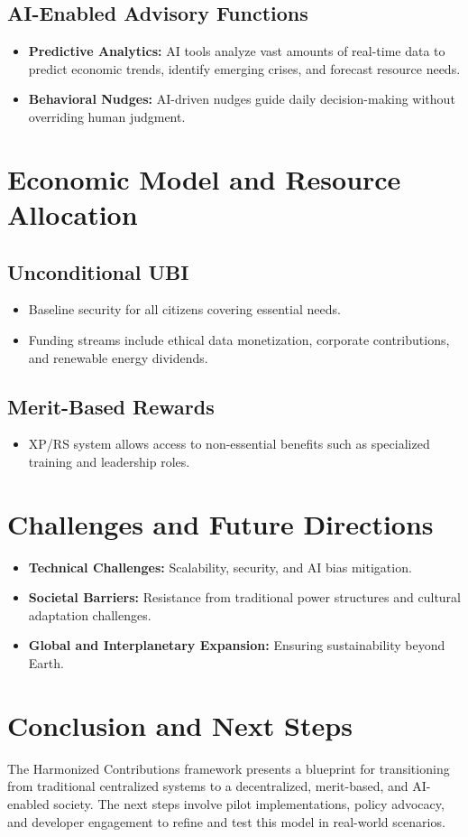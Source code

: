 \documentclass[12pt]{article}
\begin{document}
\subsection{AI-Enabled Advisory Functions}
\begin{itemize}
    \item \textbf{Predictive Analytics:} AI tools analyze vast amounts of real-time data to predict economic trends, identify emerging crises, and forecast resource needs.
    \item \textbf{Behavioral Nudges:} AI-driven nudges guide daily decision-making without overriding human judgment.
\end{itemize}

\section{Economic Model and Resource Allocation}
\subsection{Unconditional UBI}
\begin{itemize}
    \item Baseline security for all citizens covering essential needs.
    \item Funding streams include ethical data monetization, corporate contributions, and renewable energy dividends.
\end{itemize}

\subsection{Merit-Based Rewards}
\begin{itemize}
    \item XP/RS system allows access to non-essential benefits such as specialized training and leadership roles.
\end{itemize}

\section{Challenges and Future Directions}
\begin{itemize}
    \item \textbf{Technical Challenges:} Scalability, security, and AI bias mitigation.
    \item \textbf{Societal Barriers:} Resistance from traditional power structures and cultural adaptation challenges.
    \item \textbf{Global and Interplanetary Expansion:} Ensuring sustainability beyond Earth.
\end{itemize}

\section{Conclusion and Next Steps}
The Harmonized Contributions framework presents a blueprint for transitioning from traditional centralized systems to a decentralized, merit-based, and AI-enabled society. The next steps involve pilot implementations, policy advocacy, and developer engagement to refine and test this model in real-world scenarios.
\end{document}
